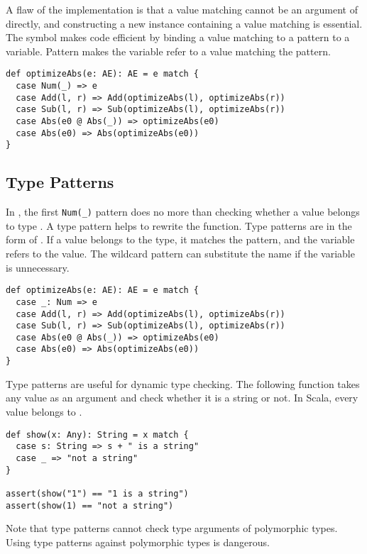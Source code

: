 A flaw of the implementation is that a value matching 
cannot be an argument of  directly, and constructing a new
 instance containing a value matching  is essential.
The  symbol makes code efficient by binding a value matching to a pattern to a variable.
Pattern  makes the variable refer to a value
matching the pattern.

\begin{verbatim}
def optimizeAbs(e: AE): AE = e match {
  case Num(_) => e
  case Add(l, r) => Add(optimizeAbs(l), optimizeAbs(r))
  case Sub(l, r) => Sub(optimizeAbs(l), optimizeAbs(r))
  case Abs(e0 @ Abs(_)) => optimizeAbs(e0)
  case Abs(e0) => Abs(optimizeAbs(e0))
}
\end{verbatim}

\subsection{Type Patterns}

In ,
the first \verb!Num(_)! pattern does no more than checking whether a value
belongs to type . A type pattern helps to rewrite the function. Type
patterns are in the form of \code{[name]: [type]}. If a value belongs to the
type, it matches the pattern, and the variable refers to the value. The wildcard
pattern can substitute the name if the variable is unnecessary.

\begin{verbatim}
def optimizeAbs(e: AE): AE = e match {
  case _: Num => e
  case Add(l, r) => Add(optimizeAbs(l), optimizeAbs(r))
  case Sub(l, r) => Sub(optimizeAbs(l), optimizeAbs(r))
  case Abs(e0 @ Abs(_)) => optimizeAbs(e0)
  case Abs(e0) => Abs(optimizeAbs(e0))
}
\end{verbatim}

Type patterns are useful for dynamic type checking. The following function takes
any value as an argument and check whether it is a string or
not. In Scala, every value belongs to .

\begin{verbatim}
def show(x: Any): String = x match {
  case s: String => s + " is a string"
  case _ => "not a string"
}

assert(show("1") == "1 is a string")
assert(show(1) == "not a string")
\end{verbatim}

Note that type patterns cannot check type arguments of polymorphic types. Using
type patterns against polymorphic types is dangerous.

